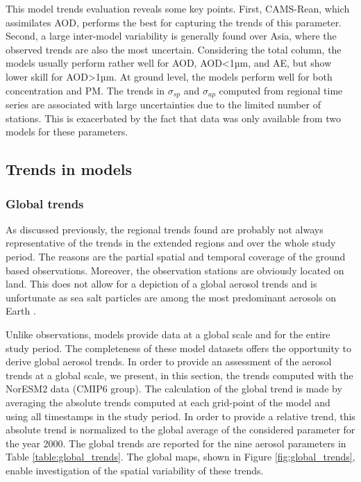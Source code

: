 \documentclass[acp, manuscript]{copernicus}
\begin{document}
This model trends evaluation reveals some key points. First, CAMS-Rean, which assimilates AOD, performs the best for capturing the trends of this parameter. Second, a large inter-model variability is generally found over Asia, where the observed trends are also the most uncertain.
Considering the total column, the models usually perform rather well for AOD, AOD<1µm, and AE, but show lower skill for AOD>1µm. At ground level, the models perform well for both  concentration and PM. The trends in $\sigma_{sp}$ and $\sigma_{ap}$ computed from regional time series are associated with large uncertainties due to the limited number of stations. This is exacerbated by the fact that data was only available from two models for these parameters.


\subsection{Trends in models}\label{global_trends}

\subsubsection{Global trends}

As discussed previously, the regional trends found are probably not always representative of the trends in the extended regions and over the whole study period. The reasons are the partial spatial and temporal coverage of the ground based observations. Moreover, the observation stations are obviously located on land. This does not allow for a depiction of a global aerosol trends and is unfortunate as sea salt particles are among the most predominant aerosols on Earth \citep{schulz2004sea}.

Unlike observations, models provide data at a global scale and for the entire study period. The completeness of these model datasets offers the opportunity to derive global aerosol trends. In order to provide an assessment of the aerosol trends at a global scale, we present, in this section, the trends computed with the NorESM2 data (CMIP6 group). The calculation of the global trend is made by averaging the absolute trends computed at each grid-point of the model and using all timestamps in the study period. In order to provide a relative trend, this absolute trend is normalized to the global average of the considered parameter for the year 2000. The global trends are reported for the nine aerosol parameters in Table \ref{table:global_trends}. The global maps, shown in Figure \ref{fig:global_trends}, enable investigation of the spatial variability of these trends.
\end{document}
